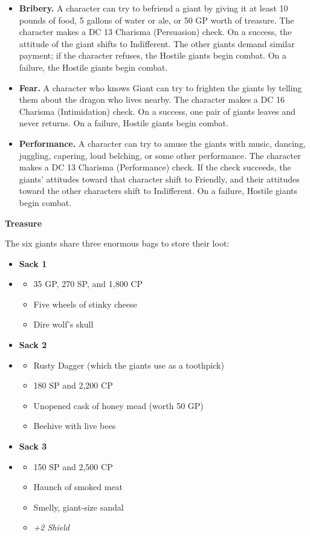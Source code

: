 \documentclass[letterpaper, 11pt, twocolumn]{dndbook}
\begin{document}
\begin{itemize}
\item \textbf{Bribery.} A character can try to befriend a giant by giving it at least 10 pounds of food, 5 gallons of water or ale, or 50 GP worth of treasure. The character makes a DC 13 Charisma (Persuasion) check. On a success, the attitude of the giant shifts to Indifferent. The other giants demand similar payment; if the character refuses, the Hostile giants begin combat. On a failure, the Hostile giants begin combat.
\item \textbf{Fear.} A character who knows Giant can try to frighten the giants by telling them about the dragon who lives nearby. The character makes a DC 16 Charisma (Intimidation) check. On a success, one pair of giants leaves and never returns. On a failure, Hostile giants begin combat.
\item \textbf{Performance.} A character can try to amuse the giants with music, dancing, juggling, capering, loud belching, or some other performance. The character makes a DC 13 Charisma (Performance) check. If the check succeeds, the giants' attitudes toward that character shift to Friendly, and their attitudes toward the other characters shift to Indifferent. On a failure, Hostile giants begin combat.
\end{itemize}

\textbf{Treasure}

The six giants share three enormous bags to store their loot:

\begin{itemize}
\item \textbf{Sack 1}
\item \begin{itemize}
\item 35 GP, 270 SP, and 1,800 CP
\item Five wheels of stinky cheese
\item Dire wolf's skull
\end{itemize}
\item \textbf{Sack 2}
\item \begin{itemize}
\item Rusty Dagger (which the giants use as a toothpick)
\item 180 SP and 2,200 CP
\item Unopened cask of honey mead (worth 50 GP)
\item Beehive with live bees
\end{itemize}
\item \textbf{Sack 3}
\item \begin{itemize}
\item 150 SP and 2,500 CP
\item Haunch of smoked meat
\item Smelly, giant-size sandal
\item \textit{+2 Shield}
\end{itemize}
\end{itemize}
\end{document}
